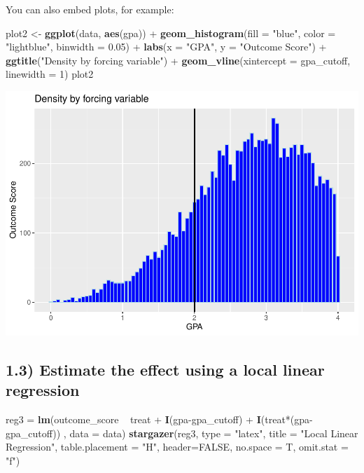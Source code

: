 \documentclass[]{article}
\newenvironment{Shaded}{\begin{snugshade}}{\end{snugshade}}
\newcommand{\KeywordTok}[1]{\textcolor[rgb]{0.13,0.29,0.53}{\textbf{{#1}}}}
\newcommand{\DataTypeTok}[1]{\textcolor[rgb]{0.13,0.29,0.53}{{#1}}}
\newcommand{\DecValTok}[1]{\textcolor[rgb]{0.00,0.00,0.81}{{#1}}}
\newcommand{\FloatTok}[1]{\textcolor[rgb]{0.00,0.00,0.81}{{#1}}}
\newcommand{\StringTok}[1]{\textcolor[rgb]{0.31,0.60,0.02}{{#1}}}
\newcommand{\OtherTok}[1]{\textcolor[rgb]{0.56,0.35,0.01}{{#1}}}
\newcommand{\NormalTok}[1]{{#1}}
\begin{document}
You can also embed plots, for example:

\begin{Shaded}
\begin{Highlighting}[]
\NormalTok{plot2 <-}\StringTok{ }\KeywordTok{ggplot}\NormalTok{(data, }\KeywordTok{aes}\NormalTok{(gpa)) +}\StringTok{ }
\StringTok{  }\KeywordTok{geom_histogram}\NormalTok{(}\DataTypeTok{fill =} \StringTok{"blue"}\NormalTok{, }\DataTypeTok{color =} \StringTok{"lightblue"}\NormalTok{, }\DataTypeTok{binwidth =} \FloatTok{0.05}\NormalTok{) +}
\StringTok{  }\KeywordTok{labs}\NormalTok{(}\DataTypeTok{x =} \StringTok{"GPA"}\NormalTok{, }\DataTypeTok{y =} \StringTok{"Outcome Score"}\NormalTok{) +}\StringTok{ }\KeywordTok{ggtitle}\NormalTok{(}\StringTok{"Density by forcing variable"}\NormalTok{) +}
\StringTok{  }\KeywordTok{geom_vline}\NormalTok{(}\DataTypeTok{xintercept =} \NormalTok{gpa_cutoff, }\DataTypeTok{linewidth =} \DecValTok{1}\NormalTok{)}
\NormalTok{plot2}
\end{Highlighting}
\end{Shaded}

\begin{center}\includegraphics[width=0.75\linewidth]{EM2_PS4_Estrada_files/figure-latex/part2-1} \end{center}

\subsection{1.3) Estimate the effect using a local linear
regression}\label{estimate-the-effect-using-a-local-linear-regression}

\begin{Shaded}
\begin{Highlighting}[]
\NormalTok{reg3 =}\StringTok{ }\KeywordTok{lm}\NormalTok{(outcome_score ~}\StringTok{ }\NormalTok{treat +}\StringTok{ }\KeywordTok{I}\NormalTok{(gpa-gpa_cutoff) +}\StringTok{ }\KeywordTok{I}\NormalTok{(treat*(gpa-gpa_cutoff)) , }\DataTypeTok{data =} \NormalTok{data)}
\KeywordTok{stargazer}\NormalTok{(reg3, }\DataTypeTok{type =} \StringTok{"latex"}\NormalTok{, }\DataTypeTok{title =} \StringTok{"Local Linear Regression"}\NormalTok{, }\DataTypeTok{table.placement =} \StringTok{"H"}\NormalTok{,}
          \DataTypeTok{header=}\OtherTok{FALSE}\NormalTok{, }\DataTypeTok{no.space =} \NormalTok{T, }\DataTypeTok{omit.stat =} \StringTok{"f"}\NormalTok{)}
\end{Highlighting}
\end{Shaded}
\end{document}
